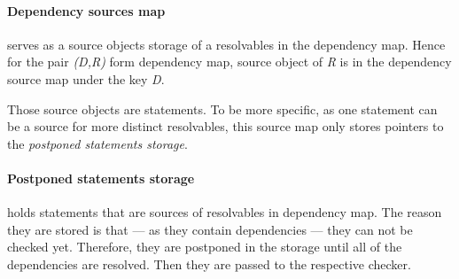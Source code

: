 \paragraph*{Dependency sources map} serves as a source objects storage of a resolvables in the dependency map. Hence for the pair \emph{(D,R)} form dependency map, source object of \emph{R} is in the dependency source map under the key \emph{D}. 

Those source objects are statements. To be more specific, as one statement can be a source for more distinct resolvables, this source map only stores pointers to the \emph{postponed statements storage}.

\paragraph*{Postponed statements storage} holds statements that are sources of resolvables in dependency map. The reason they are stored is that --- as they contain dependencies --- they can not be checked yet. Therefore, they are postponed in the storage until all of the dependencies are resolved. Then they are passed to the respective checker.



